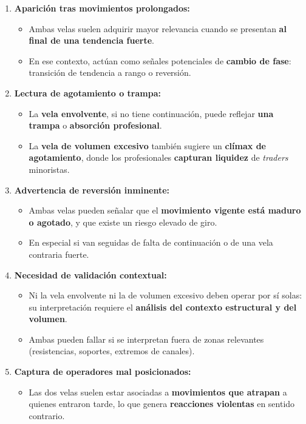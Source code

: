 \begin{enumerate}
    \item \textbf{Aparici\'on tras movimientos prolongados:}
    \begin{itemize}
        \item Ambas velas suelen adquirir mayor relevancia cuando se presentan \textbf{al final de una tendencia fuerte}.
        \item En ese contexto, act\'uan como se\~nales potenciales de \textbf{cambio de fase}: transici\'on de tendencia a rango o reversi\'on.
    \end{itemize}

    \item \textbf{Lectura de agotamiento o trampa:}
    \begin{itemize}
        \item La \textbf{vela envolvente}, si no tiene continuaci\'on, puede reflejar \textbf{una trampa} o \textbf{absorci\'on profesional}.
        \item La \textbf{vela de volumen excesivo} tambi\'en sugiere un \textbf{cl\'imax de agotamiento}, donde los profesionales \textbf{capturan liquidez} de \textit{traders} minoristas.
    \end{itemize}

    \item \textbf{Advertencia de reversi\'on inminente:}
    \begin{itemize}
        \item Ambas velas pueden se\~nalar que el \textbf{movimiento vigente est\'a maduro o agotado}, y que existe un riesgo elevado de giro.
        \item En especial si van seguidas de falta de continuaci\'on o de una vela contraria fuerte.
    \end{itemize}

    \item \textbf{Necesidad de validaci\'on contextual:}
    \begin{itemize}
        \item Ni la vela envolvente ni la de volumen excesivo deben operar por s\'i solas: su interpretaci\'on requiere el \textbf{an\'alisis del contexto estructural y del volumen}.
        \item Ambas pueden fallar si se interpretan fuera de zonas relevantes (resistencias, soportes, extremos de canales).
    \end{itemize}

    \item \textbf{Captura de operadores mal posicionados:}
    \begin{itemize}
        \item Las dos velas suelen estar asociadas a \textbf{movimientos que atrapan} a quienes entraron tarde, lo que genera \textbf{reacciones violentas} en sentido contrario.
    \end{itemize}
\end{enumerate}

